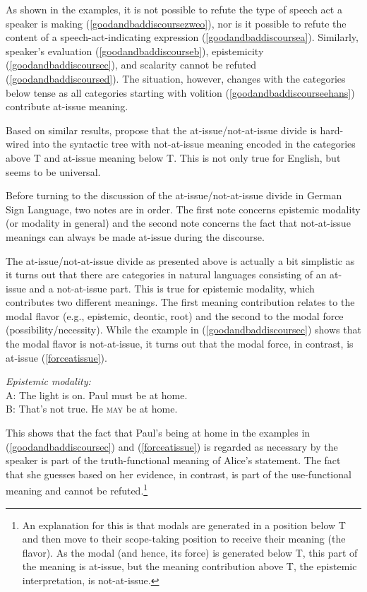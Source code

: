  
\noindent As shown in the examples, it is not possible to refute the type of speech act a speaker is making (\ref{goodandbaddiscoursezweo}), nor is it possible to refute the content of a speech-act-indicating expression (\ref{goodandbaddiscoursea}). Similarly, speaker's evaluation (\ref{goodandbaddiscourseb}), epistemicity (\ref{goodandbaddiscoursec}), and scalarity cannot be refuted (\ref{goodandbaddiscoursed}). The situation, however, changes with the categories below tense as all categories starting with volition (\ref{goodandbaddiscourseehans}) contribute at-issue meaning.

Based on similar results, \citet{bross2017scope} propose that the at-issue/not-at-issue divide is hard-wired into the syntactic tree with not-at-issue meaning encoded in the categories above T and at-issue meaning below T. This is not only true for English, but seems to be universal. 

Before turning to the discussion of the at-issue/not-at-issue divide in German Sign Language, two notes are in order. The first note concerns epistemic modality (or modality in general) and the second note concerns the fact that not-at-issue meanings can always be made at-issue during the discourse.

The at-issue/not-at-issue divide as presented above is actually a bit simplistic as it turns out that there are categories in natural languages consisting of an at-issue and a not-at-issue part. This is true for epistemic modality, which contributes two different meanings. The first meaning contribution relates to the modal flavor (e.g., epistemic, deontic, root) and the second to the modal force (possibility/necessity). While the example in (\ref{goodandbaddiscoursec}) shows that the modal flavor is not-at-issue, it turns out that the modal force, in contrast, is at-issue (\ref{forceatissue}).

\begin{exe}
\ex \textit{Epistemic modality:}\\ 
A: The light is on. Paul must be at home.\\
B: That's not true. He \textsc{may} be at home.  \label{forceatissue}
\end{exe}

\noindent This shows that the fact that Paul's being at home in the examples in (\ref{goodandbaddiscoursec}) and (\ref{forceatissue}) is regarded as necessary by the speaker is part of the truth-functional meaning of Alice's statement. The fact that she guesses based on her evidence, in contrast, is part of the use-functional meaning and cannot be refuted.\footnote{ An explanation for this is that modals are generated in a position below T and then move to their scope-taking position to receive their meaning (the flavor). As the modal (and hence, its force) is generated below T, this part of the meaning is at-issue, but the meaning contribution above T, the epistemic interpretation, is not-at-issue.}

